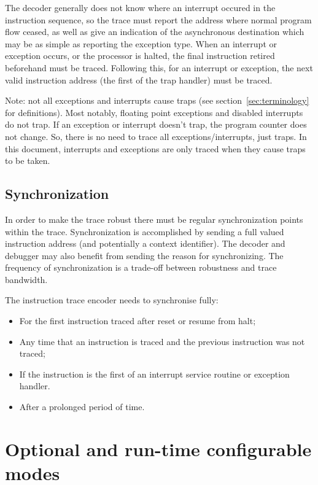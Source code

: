 The decoder generally does not know
where an interrupt occured in the instruction sequence, so the trace
must report the address where normal program flow ceased, as well as
give an indication of the asynchronous destination which may be as
simple as reporting the exception type.  When an interrupt or
exception occurs, or the processor is halted, the final instruction
retired beforehand must be traced.  Following this, for an interrupt
or exception, the next valid instruction address (the first of the
trap handler) must be traced.

Note: not all exceptions and interrupts cause traps (see 
section~\ref{sec:terminology} for definitions). Most notably, 
floating point exceptions and disabled interrupts do not trap.
If an exception or interrupt doesn't trap, the program counter does not
change. So, there is no need to trace all exceptions/interrupts, just
traps.  In this document, interrupts and exceptions are only traced when 
they cause traps to be taken.

\subsection{Synchronization} \label{synchronization}

In order to make the trace robust there must be regular
synchronization points within the trace. Synchronization is accomplished by
sending a full valued instruction address (and potentially a context
identifier). The decoder and debugger may also benefit from sending
the reason for synchronizing. The frequency of synchronization is a
trade-off between robustness and trace bandwidth.

The instruction trace encoder needs to synchronise fully:

\begin{itemize}

\item For the first instruction traced after reset or resume from halt;
\item Any time that an instruction is traced and the previous instruction was not traced;
\item If the instruction is the first of an interrupt service routine or
exception handler.
\item After a prolonged period of time.
\end{itemize}

\section{Optional and run-time configurable modes} \label{optional}


